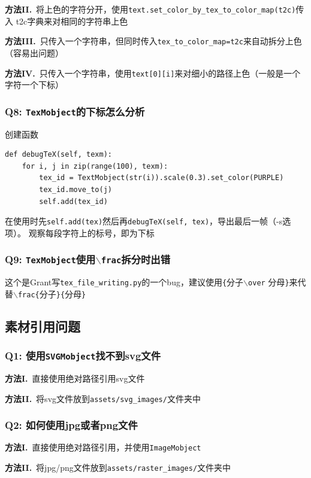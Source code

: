 \documentclass[UTF8]{ctexart}
\begin{document}
\textbf{方法II.}\ 将上色的字符分开，使用\texttt{text.set\_color\_by\_tex\_to\_color\_map(t2c)}传入
t2c字典来对相同的字符串上色

\textbf{方法III.}\ 只传入一个字符串，但同时传入\texttt{tex\_to\_color\_map=t2c}来自动拆分上色（容易出问题）

\textbf{方法IV.}\ 只传入一个字符串，使用\texttt{text[0][i]}来对细小的路径上色（一般是一个字符一个下标）

\subsubsection*{Q8: \texttt{TexMobject}的下标怎么分析}
创建函数
\begin{lstlisting}
def debugTeX(self, texm):
    for i, j in zip(range(100), texm):
        tex_id = TextMobject(str(i)).scale(0.3).set_color(PURPLE)
        tex_id.move_to(j)
        self.add(tex_id)
\end{lstlisting}
在使用时先\texttt{self.add(tex)}然后再\texttt{debugTeX(self, tex)}，导出最后一帧（-s选项）。
观察每段字符上的标号，即为下标

\subsubsection*{Q9: \texttt{TexMobject}使用\texttt{$\backslash$frac}拆分时出错}
这个是Grant写\texttt{tex\_file\_writing.py}的一个bug，建议使用\texttt{\{}分子\texttt{$\backslash$over}
分母\texttt{\}}来代替\texttt{$\backslash$frac\{}分子\texttt{\}\{}分母\texttt{\}}


\subsection{素材引用问题}
\subsubsection*{Q1: 使用\texttt{SVGMobject}找不到svg文件}
\textbf{方法I.}\ 直接使用绝对路径引用svg文件

\textbf{方法II.}\ 将svg文件放到\texttt{assets/svg\_images/}文件夹中

\subsubsection*{Q2: 如何使用jpg或者png文件}
\textbf{方法I.}\ 直接使用绝对路径引用，并使用\texttt{ImageMobject}

\textbf{方法II.}\ 将jpg/png文件放到\texttt{assets/raster\_images/}文件夹中
\end{document}
